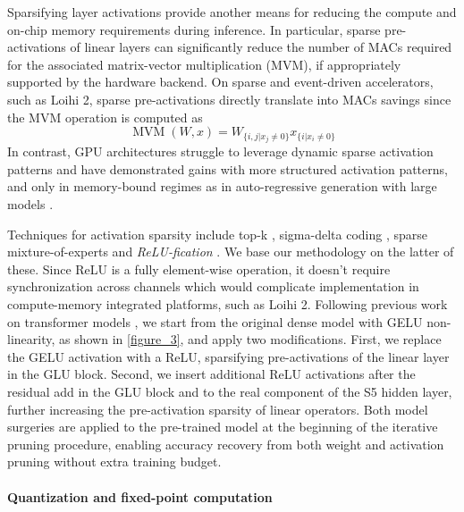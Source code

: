 Sparsifying layer activations provide another means for reducing the compute and on-chip memory requirements during inference.
In particular, sparse pre-activations of linear layers can significantly reduce the number of MACs required for the associated matrix-vector multiplication (MVM), if appropriately supported by the hardware backend.
On sparse and event-driven accelerators, such as Loihi 2, sparse pre-activations directly translate into MACs savings since the MVM operation is computed as
\begin{equation}
    \mathop{MVM}(W,x) = W_{\{ i,j | x_j \ne 0 \}} x_{\{ i | x_i \ne 0\}}
\end{equation}
In contrast, GPU architectures struggle to leverage dynamic sparse activation patterns and have demonstrated gains with more structured activation patterns, and only in memory-bound regimes as in auto-regressive generation with large models \cite{mirzadeh2024relu, zhang2024relu2winsdiscoveringefficient, DBLP:conf/iclr/ShazeerMMDLHD17, DBLP:journals/corr/abs-2407-04153}.

Techniques for activation sparsity include top-k \cite{DBLP:journals/corr/abs-2412-04358}, sigma-delta coding \cite{shrestha2024efficient, o2016sigma}, sparse mixture-of-experts \cite{fedus_switch_2022,he_mixture_2024} and \emph{ReLU-fication} \cite{mirzadeh2024relu}.
We base our methodology on the latter of these. Since ReLU is a fully element-wise operation, it doesn't require synchronization across channels which would complicate implementation in compute-memory integrated platforms, such as Loihi 2.
Following previous work on transformer models \cite{mirzadeh2024relu}, we start from the original dense model with GELU non-linearity, as shown in \autoref{figure_3}, and apply two modifications.
First, we replace the GELU activation with a ReLU, sparsifying pre-activations of the linear layer in the GLU block.
Second, we insert additional ReLU activations after the residual add in the GLU block and to the real component of the S5 hidden layer, further increasing the pre-activation sparsity of linear operators.
Both model surgeries are applied to the pre-trained model at the beginning of the iterative pruning procedure, enabling accuracy recovery from both weight and activation pruning without extra training budget.


\paragraph{Quantization and fixed-point computation}

